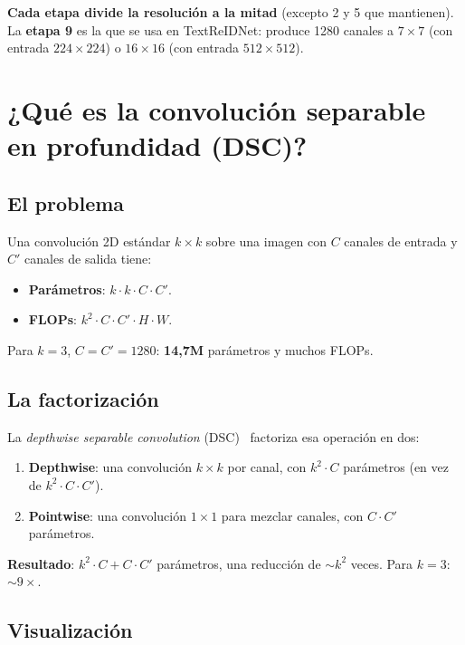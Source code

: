 \noindent\textbf{Cada etapa divide la resolución a la mitad}
(excepto 2 y 5 que mantienen). La \textbf{etapa 9} es la que se usa
en TextReIDNet: produce 1280 canales a $7 \times 7$ (con entrada
$224 \times 224$) o $16 \times 16$ (con entrada $512 \times 512$).

\section{¿Qué es la convolución separable en profundidad (DSC)?}

\subsection{El problema}

Una convolución 2D estándar $k \times k$ sobre una imagen con $C$
canales de entrada y $C'$ canales de salida tiene:
\begin{itemize}
  \item \textbf{Parámetros}: $k \cdot k \cdot C \cdot C'$.
  \item \textbf{FLOPs}: $k^2 \cdot C \cdot C' \cdot H \cdot W$.
\end{itemize}

\noindent Para $k=3$, $C=C'=1280$: \textbf{14,7M} parámetros y
muchos FLOPs.

\subsection{La factorización}

La \emph{depthwise separable convolution} (DSC)~\cite{howard2017mobilenets}
factoriza esa operación en dos:

\begin{enumerate}
  \item \textbf{Depthwise}: una convolución $k \times k$ por canal,
        con $k^2 \cdot C$ parámetros (en vez de $k^2 \cdot C \cdot C'$).
  \item \textbf{Pointwise}: una convolución $1 \times 1$ para mezclar
        canales, con $C \cdot C'$ parámetros.
\end{enumerate}

\noindent\textbf{Resultado}: $k^2 \cdot C + C \cdot C'$ parámetros,
una reducción de $\sim k^2$ veces. Para $k=3$: $\sim 9\times$.

\subsection{Visualización}

